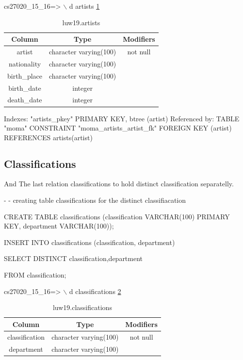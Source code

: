 \documentclass[journal,transmag]{IEEEtran}
\begin{document}
cs27020\_15\_16=> $\backslash$ d artists \ref{artists}
\newline

\begin{table}[]
\centering
\caption{luw19.artists}
\label{artists}
\begin{tabular}{c|c|c}
Column       & Type                   & Modifiers \\ \hline
artist       & character varying(100) & not null  \\
nationality  & character varying(100) &           \\
birth\_place & character varying(100) &           \\
birth\_date  & integer                &           \\
death\_date  & integer                &          
\end{tabular}
\end{table}


Indexes:
    "artists\_pkey" PRIMARY KEY, btree (artist)
Referenced by:
    TABLE "moma" CONSTRAINT "moma\_artists\_artist\_fk" FOREIGN KEY (artist) REFERENCES artists(artist)
\newline



\subsection {Classifications}

And The last relation classifications to hold distinct classification separatelly.
\newline

- - creating table classifications for the distinct classifiacation

CREATE TABLE classifications (classification VARCHAR(100) PRIMARY KEY, department VARCHAR(100));

INSERT INTO classifications (classification, department)

    SELECT DISTINCT classification,department

      FROM classification;
\newline

cs27020\_15\_16=> $\backslash$ d classifications \ref {classifications}


\begin{table}[]
\centering
\caption{luw19.classifications}
\label{classifications}
\begin{tabular}{c|c|c}
Column         & Type                   & Modifiers \\ \hline
classification & character varying(100) & not null  \\
department     & character varying(100) &          
\end{tabular}
\end{table}
\end{document}
